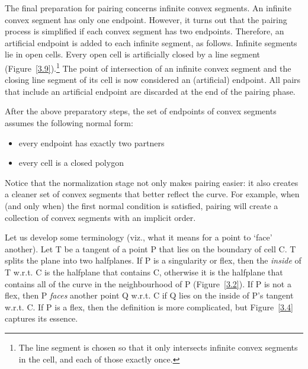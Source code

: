 The final preparation for pairing concerns infinite convex segments.
An infinite convex segment has only one endpoint.
However, it turns out that the pairing process is simplified if each 
convex segment has two endpoints.
Therefore, an artificial endpoint is added to each infinite segment,
as follows.
Infinite segments lie in open cells. 
Every open cell is artificially closed by a line 
segment (Figure~\ref{3.9}).\footnote{The line segment is chosen so that it
	only intersects infinite convex segments in the cell,
	and each of those exactly once.}
The point of intersection of an infinite convex segment and the closing
line segment of its cell is now considered an (artificial) endpoint.
All pairs that include an artificial endpoint are discarded at the end of
the pairing phase.

After the above preparatory steps, 
the set of endpoints of convex segments assumes the following normal form:
\begin{itemize}
\item
	 every endpoint has exactly two partners
\item
	 every cell is a closed polygon
\end{itemize}
Notice that the normalization stage not only makes pairing easier:
it also creates a cleaner set of convex segments that better reflect the curve.
For example, when (and only when) the first normal condition is satisfied,
pairing will create a collection of convex segments with an implicit order.

Let us develop some terminology (viz., what it means for a point to 
`face' another).
Let T be a tangent of a point P that lies on the boundary of cell C.
T splits the plane into two halfplanes.
If P is a singularity or flex, then the {\em inside} of T w.r.t. C 
is the halfplane that contains C, otherwise it is the halfplane that contains
all of the curve in the neighbourhood of P (Figure~\ref{3.2}).
If P is not a flex, then P {\em faces} another point Q w.r.t. C 
if Q lies on the inside of P's tangent w.r.t. C.
If P is a flex, then the definition is more complicated,
but Figure~\ref{3.4} captures its essence.

